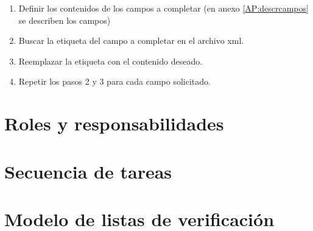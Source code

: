 \documentclass{GVT_CONAE_Class}
\begin{document}
\begin{enumerate}
    \item Definir los contenidos de los campos a completar (en anexo \ref{AP:descrcampos} se describen los campos)
    \item Buscar la etiqueta del campo a completar en el archivo xml.
    \item Reemplazar la etiqueta con el contenido deseado.
    \item Repetir los pasos 2 y 3 para cada campo solicitado.
\end{enumerate}




\section{Roles y responsabilidades}

\section{Secuencia de tareas}



\section{Modelo de listas de verificación}





\newpage %
\appendix
\end{document}
